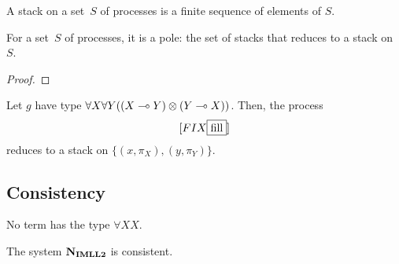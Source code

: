   A stack on a set~$S$ of processes is a finite sequence of elements of
  $S$.
   \begin{proposition}
    For a set~$S$ of processes,
    it is a pole: the set of stacks that reduces to a stack on $S$.
   \end{proposition}
    \begin{proof}
    \end{proof}

  \begin{proposition}
   Let $g$ have type ${\forall X\forall
   Y((X\multimap Y)\otimes (Y\multimap X))}$.
   Then, the process
   \[
   [FIX \fbox{fill}]
   \]
   reduces to a stack on
   $\{(x,\pi_X), (y,\pi_Y)\}$.
  \end{proposition}

\subsection{Consistency}

\begin{proposition}
  No term has the type $\forall X X$.
\end{proposition}
\begin{corollary}
 The system $\mathbf{N}_{\mathbf{IMLL2}}$ is consistent.
\end{corollary}
